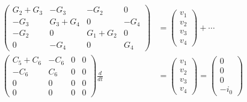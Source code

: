 \documentclass[]{article}
\begin{document}
\[
\begin{align*}
\begin{pmatrix}
G_2 + G_3 & -G_3 & -G_2 & 0 \\ 
-G_3 & G_3 + G_4 & 0 & -G_4 \\ 
-G_2 & 0 & G_1 + G_2 & 0 \\ 
0 & -G_4 & 0 & G_4
\end{pmatrix}
&=
\begin{pmatrix}
v_1 \\ 
v_2 \\ 
v_3 \\ 
v_4
\end{pmatrix}
+ \cdots \\ 
\begin{pmatrix}
C_5 + C_6 & -C_6 & 0 & 0 \\ 
-C_6 & C_6 & 0 & 0 \\ 
0 & 0 & 0 & 0 \\ 
0 & 0 & 0 & 0
\end{pmatrix}
\frac{d}{dt} &=
\begin{pmatrix}
v_1 \\ 
v_2 \\ 
v_3 \\ 
v_4
\end{pmatrix} =
\begin{pmatrix}
0 \\ 
0 \\ 
0 \\ 
-i_0
\end{pmatrix}
\end{align*}
\]
\end{document}
